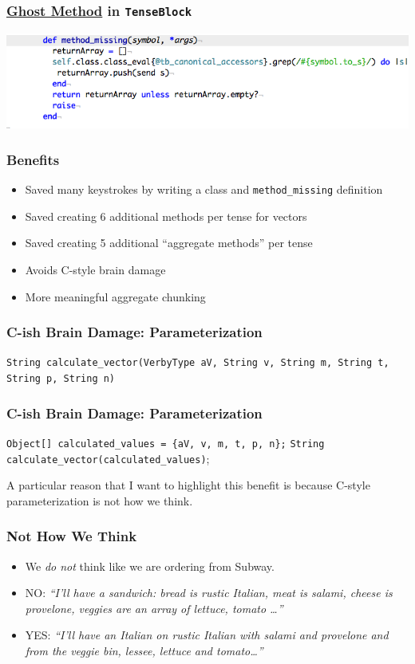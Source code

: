 \documentclass[slidestop,compress,mathserif]{beamer}
\begin{document}
\begin{frame}
	\frametitle{\underline{Ghost Method} in \texttt{TenseBlock}}
	\includegraphics[scale=0.45]{img/tenseblock_mm.png}
\end{frame}


\begin{frame}
	\frametitle{Benefits}
	\begin{itemize}
		\item Saved many keystrokes by writing a class and \texttt{method\_missing} definition
		\pause
		\item Saved creating 6 additional methods per tense for vectors
		\pause
		\item Saved creating 5 additional ``aggregate methods'' per tense
		\pause
		\item Avoids C-style brain damage
		\pause
		\item More meaningful aggregate chunking
	\end{itemize}
\end{frame}

\begin{frame}
	\frametitle{C-ish Brain Damage:  Parameterization}	
 	\texttt{String calculate\_vector(VerbyType aV, String v, String m, String t, String p, String n)}
\end{frame}

\begin{frame}
	\frametitle{C-ish Brain Damage:  Parameterization}	
	\texttt{Object[] calculated\_values = \{aV, v, m, t, p, n\};} 
	\texttt{String calculate\_vector(calculated\_values)}; 
\end{frame}
\note
{A particular reason that I want to highlight this benefit is because C-style
parameterization is not how we think.
}

\begin{frame}
	\frametitle{Not How We Think}
	\begin{itemize}
		\item We \emph{do not} think like we are ordering from Subway.
		\pause
		\item NO:  \emph{``I'll have a sandwich:  bread is rustic Italian, meat is salami, cheese is provelone, veggies are an array of lettuce, tomato \ldots''}
		\pause
		\item YES:  \emph{``I'll have an Italian on rustic Italian with salami and provelone and from the veggie bin, lessee, lettuce and tomato\ldots''}
	\end{itemize}
	
\end{frame}
\end{document}

